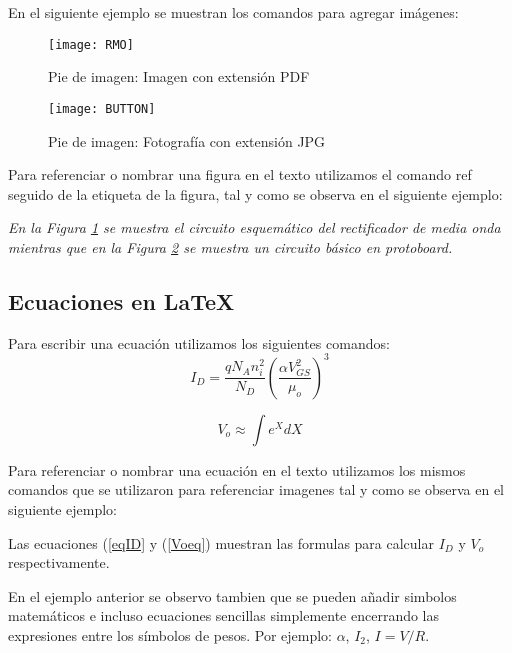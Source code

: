 En el siguiente ejemplo se muestran los comandos para agregar imágenes:

\begin{figure}[h!] \centering 
\texttt{[image: RMO]}    %
\caption{Pie de imagen: Imagen con extensión PDF}  %
\label{Fig:Rectificador}         %
\end{figure}  

\begin{figure}[h!] \centering
\texttt{[image: BUTTON]}
\caption{Pie de imagen: Fotografía con extensión  JPG}
\label{Fig:PushButton}
\end{figure}  


Para referenciar o nombrar una figura en el texto utilizamos el comando ref seguido de la etiqueta de la figura, tal y como se observa en el siguiente ejemplo: 

\textit{En la Figura \ref{Fig:Rectificador} se muestra el circuito esquemático del  rectificador de media onda mientras que  en la Figura \ref{Fig:PushButton} se muestra un circuito básico en protoboard.}


\subsection{Ecuaciones en \LaTeX}

Para escribir una ecuación utilizamos los siguientes comandos:
\begin{equation}
\label{eqID}        %
I_D=\frac{q N_A n_i^2}{N_D}\left(\frac{\alpha V_{GS}^2}{\mu_o}\right)^3
\end{equation}

\begin{equation}\label{Voeq} 
V_o \approx \int e^XdX
\end{equation}

Para referenciar o nombrar una ecuación en el texto utilizamos los mismos comandos que se utilizaron para referenciar imagenes tal y como se observa en el siguiente ejemplo:

Las ecuaciones (\ref{eqID} y (\ref{Voeq}) muestran las formulas para calcular $I_D$ y $V_o$ respectivamente.

En el ejemplo anterior se observo tambien que se pueden añadir simbolos matemáticos e incluso ecuaciones sencillas simplemente encerrando las expresiones entre los símbolos de pesos. Por ejemplo: $\alpha$, $I_2$, $I=V/R$. 

